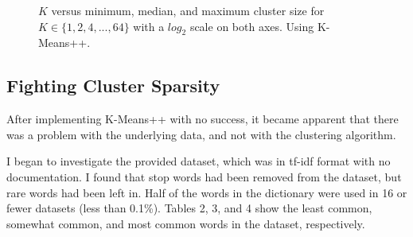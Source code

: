\documentclass{article} %
\begin{document}
\begin{figure}[h]
\begin{center}
\end{center}
\caption{$K$ versus minimum, median, and maximum cluster size for $K \in \{1,2,4,...,64\}$ with a $log_{2}$ scale on both axes. Using K-Means++.}
\end{figure}

\subsection{Fighting Cluster Sparsity}

After implementing K-Means++ with no success, it became apparent that there was a problem with the underlying data, and not with the clustering algorithm. 

I began to investigate the provided dataset, which was in tf-idf format with no documentation. I found that stop words had been removed from the dataset, but rare words had been left in. Half of the words in the dictionary were used in 16 or fewer datasets (less than 0.1\%). Tables 2, 3, and 4 show the least common, somewhat common, and most common words in the dataset, respectively.
\end{document}
